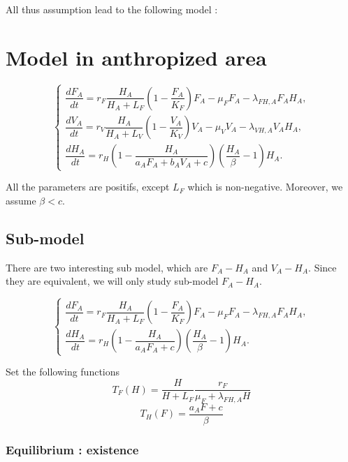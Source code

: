 \documentclass{article}
\newcommand{\lfa}{\lambda_{FH, A}}
\begin{document}
All thus assumption lead to the following model :


\newpage
\section{Model in anthropized area}

\begin{equation}
\left\{ \begin{array}{l}
\dfrac{dF_{A}}{dt}=r_F \dfrac{H_A}{H_A+L_F}\left(1-\dfrac{F_A}{K_{F}}\right)F_A-\mu_{F}F_A-\lambda_{FH,A}F_AH_A,\\
\dfrac{dV_A}{dt}=r_{V}\dfrac{H_A}{H_A+L_{V}}\left(1-\dfrac{V_A}{K_{V}}\right)V_A-\mu_{V}V_A-\lambda_{VH,A}V_AH_A,\\
\dfrac{dH_A}{dt}=r_{H}\left(1-\dfrac{H_A}{a_{A}F_{A}+b_{A}V_{A}+c}\right)\left(\dfrac{H_A}{\beta}-1\right)H_A.
\end{array}\right.
\label{modelAnthropo}
\end{equation}

All the parameters are positifs, except $L_F$ which is non-negative. Moreover, we assume $\beta < c$.

\subsection{Sub-model}
There are two interesting sub model, which are $F_A-H_A$ and $V_A-H_A$. Since they are equivalent, we will only study sub-model $F_A-H_A$.

\begin{equation}
\left\{ \begin{array}{l}
\dfrac{dF_{A}}{dt}=r_F \dfrac{H_A}{H_A+L_F} \left(1-\dfrac{F_A}{K_{F}}\right)F_A-\mu_{F}F_A-\lambda_{FH,A}F_AH_A,\\
\dfrac{dH_A}{dt}=r_{H}\left(1-\dfrac{H_A}{a_{A}F_{A}+c}\right)\left(\dfrac{H_A}{\beta}-1\right)H_A.
\end{array}\right.
\label{submodelAnthropoFH}
\end{equation}

Set the following functions
\begin{equation}
T_F(H) = \dfrac{H}{H + L_F}\dfrac{r_F}{\mu_F + \lfa H}
\label{threshold:TF(H)}
\end{equation}
\begin{equation}
T_H(F) = \dfrac{a_A F + c }{\beta}
\label{threshold:TH(F)}
\end{equation}

\subsubsection{Equilibrium : existence}
\end{document}
